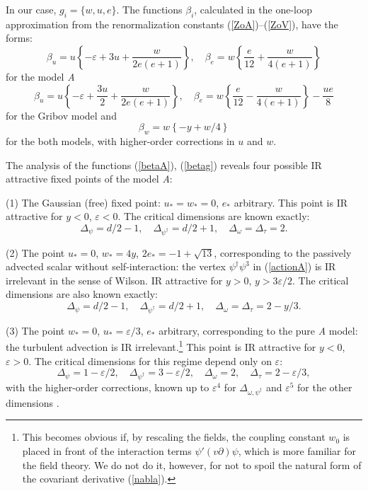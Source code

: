 \documentclass[12pt]{iopart}
\begin{document}
In our case, $g_{i}= \{w,u,e\}$. The functions $\beta_{i}$, calculated in
the one-loop approximation from the renormalization constants
(\ref{ZoA})--(\ref{ZoV}), have the forms:
\begin{equation}
\beta_{u} = u \left\{-\varepsilon + 3u +\frac{w}{2e(e+1)} \right\},
\quad \beta_{e} = w \left\{ \frac{e}{12} +\frac{w}{4(e+1)} \right\}
\label{betaA}
\end{equation}
for the model {\it A}
\begin{equation}
\beta_{u} = u \left\{-\varepsilon + \frac{3u}{2} +\frac{w}{2e(e+1)} \right\},
\quad \beta_{e} = w \left\{ \frac{e}{12}- \frac{w}{4(e+1)} \right\}
- \frac{ue}{8}
\label{betaG}
\end{equation}
for the Gribov model and
\begin{equation}
\beta_{w} = w \left\{-y+w/4\right\}
\label{betag}
\end{equation}
for the both models, with higher-order corrections in $u$ and $w$.

The analysis of the functions (\ref{betaA}), (\ref{betag}) reveals four
possible IR attractive fixed points of the model {\it A}:

(1) The Gaussian (free) fixed point: $u_{*}=w_{*}=0$, $e_{*}$ arbitrary.
This point is IR attractive for $y<0$, $\varepsilon<0$. The critical
dimensions are known exactly:
\[ \Delta_{\psi}=d/2-1, \quad  \Delta_{\psi^{\dag}}=d/2+1, \quad
\Delta_{\omega}=\Delta_{\tau}=2. \]

(2) The point $u_{*}=0$,  $w_{*}=4y$,  $2e_{*} = -1+\sqrt{13}$,
corresponding to the passively advected scalar without self-interaction:
the vertex $\psi^{\dag}\psi^{3}$ in (\ref{actionA}) is IR irrelevant in the
sense of Wilson. IR attractive for $y>0$, $y>3\varepsilon/2$. The critical
dimensions are also known exactly:
\[ \Delta_{\psi}=d/2-1, \quad  \Delta_{\psi^{\dag}}=d/2+1, \quad
\Delta_{\omega}=\Delta_{\tau}=2-y/3. \]



(3) The point $w_{*}=0$, $u_{*}=\varepsilon/3$, $e_{*}$ arbitrary,
corresponding to the pure {\it A} model: the turbulent advection is
IR irrelevant.\footnote{This becomes obvious if,
by rescaling the fields, the coupling constant $w_{0}$ is placed in
front of the interaction terms $\psi'(v \partial) \psi$, which is more
familiar for the field theory. We do not do it, however, for not to spoil
the natural form of the covariant derivative (\protect\ref{nabla}).}
This point is IR attractive for $y<0$, $\varepsilon>0$. The critical
dimensions for this regime depend only on $\varepsilon$:
\[ \Delta_{\psi}=1-\varepsilon/2, \quad
\Delta_{\psi^{\dag}}=3-\varepsilon/2, \quad
\Delta_{\omega}=2, \quad \Delta_{\tau}=2-\varepsilon/3, \]
with the higher-order corrections, known up to $\varepsilon^{4}$ for
$\Delta_{\omega,\psi^{\dag}}$ \cite{Levca} and $\varepsilon^{5}$ for
the other dimensions \cite{Zinn,Book3}.
\end{document}
